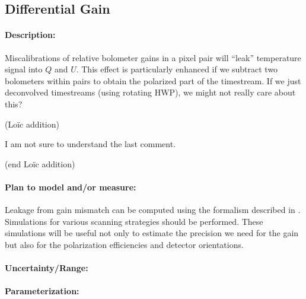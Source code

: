 \subsection{Differential Gain}

\paragraph{Description:}
Miscalibrations of relative bolometer gains in a pixel pair will ``leak'' temperature signal into $Q$ and $U$.
This effect is particularly enhanced if we subtract two bolometers within pairs to obtain the polarized part of the timestream. If we just deconvolved timestreams (using rotating HWP), we might not really care about this?

(Loïc addition)

I am not sure to understand the last comment.

(end Loïc addition)


\paragraph{Plan to model and/or measure:}
Leakage from gain mismatch can be computed using the formalism described in \cite{rosset2010}. Simulations for various scanning strategies should be performed. These simulations will be useful not only to estimate the precision we need for the gain but also for the polarization efficiencies and detector orientations.

\paragraph{Uncertainty/Range:}

\paragraph{Parameterization:}
